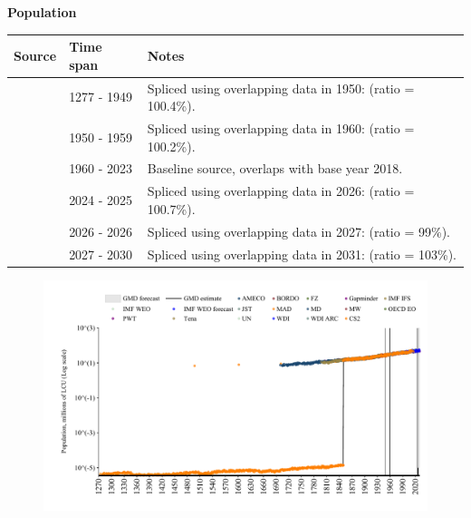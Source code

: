 \documentclass[12pt,a4paper,landscape]{article}
\begin{document}
\begin{adjustbox}{max totalsize={\paperwidth}{\paperheight},center}
\begin{minipage}[t][\textheight][t]{\textwidth}
\vspace*{0.5cm}
{}
\begin{center}
{\Large\bfseries Population}
\end{center}
\vspace{0.5cm}
\begin{table}[H]
\centering
\small
\begin{tabular}{|l|l|l|}
\hline
\textbf{Source} & \textbf{Time span} & \textbf{Notes} \\
\hline
\rowcolor{white}\cite{CS2_ESP}& 1277 - 1949 &Spliced using overlapping data in 1950: (ratio = 100.4\%). \\
\rowcolor{lightgray}\cite{IMF_IFS}& 1950 - 1959 &Spliced using overlapping data in 1960: (ratio = 100.2\%). \\
\rowcolor{white}\cite{WDI}& 1960 - 2023 &Baseline source, overlaps with base year 2018. \\
\rowcolor{lightgray}\cite{OECD_EO}& 2024 - 2025 &Spliced using overlapping data in 2026: (ratio = 100.7\%). \\
\rowcolor{white}\cite{AMECO}& 2026 - 2026 &Spliced using overlapping data in 2027: (ratio = 99\%). \\
\rowcolor{lightgray}\cite{Gapminder}& 2027 - 2030 &Spliced using overlapping data in 2031: (ratio = 103\%). \\
\hline
\end{tabular}
\end{table}
\begin{figure}[H]
\centering
\includegraphics[width=\textwidth,height=0.6\textheight,keepaspectratio]{graphs/ESP_pop.pdf}
\end{figure}
\end{minipage}
\end{adjustbox}
\end{document}
